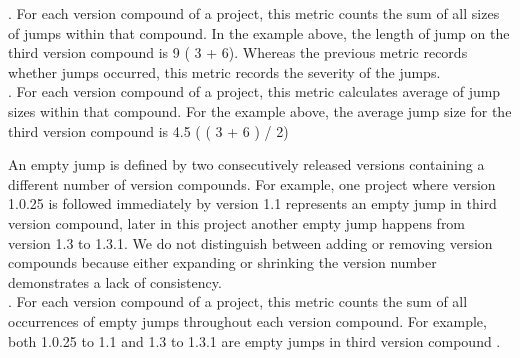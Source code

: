 \documentclass[conference]{IEEEtran}
\begin{document}
.  For each version compound of a project, this metric counts the sum of all sizes of jumps within that compound. 
In the example above, the length of jump on the third version compound is 
9 ( 3 + 6). Whereas the previous metric records whether jumps occurred, this metric records the severity of the jumps. \\
 
. For each version compound of a project, this metric calculates average of  jump sizes within that compound. For the example above, the average jump size for the third version compound is 4.5 ( ( 3 + 6 ) / 2)
 



 An empty jump is defined by two consecutively released versions containing a different number of version compounds. 
For example, one project where version 1.0.25 is followed immediately by version 1.1 represents an empty jump in third version compound, later in this project another empty jump happens from version 1.3 to 1.3.1. We do not distinguish between adding or removing version compounds because either expanding or shrinking the version number demonstrates a lack of consistency.  \\


. For each version compound of a project, this metric counts the sum of all occurrences of empty jumps throughout each version compound.
For example, both 1.0.25 to 1.1 and 1.3 to 1.3.1 are empty jumps in third version compound . \\
\end{document}
